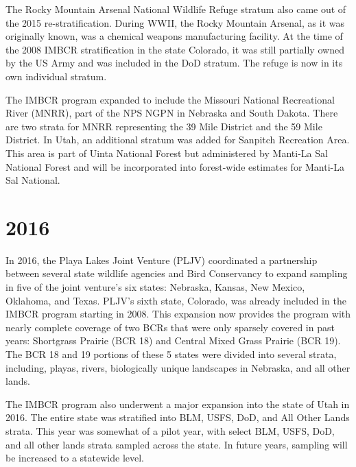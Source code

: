 \documentclass[
  letterpaper,
  DIV=11,
  numbers=noendperiod,
  oneside]{scrreprt}
\begin{document}
The Rocky Mountain Arsenal National Wildlife Refuge stratum also came
out of the 2015 re-stratification. During WWII, the Rocky Mountain
Arsenal, as it was originally known, was a chemical weapons
manufacturing facility. At the time of the 2008 IMBCR stratification in
the state Colorado, it was still partially owned by the US Army and was
included in the DoD stratum. The refuge is now in its own individual
stratum.

The IMBCR program expanded to include the Missouri National Recreational
River (MNRR), part of the NPS NGPN in Nebraska and South Dakota. There
are two strata for MNRR representing the 39 Mile District and the 59
Mile District. In Utah, an additional stratum was added for Sanpitch
Recreation Area. This area is part of Uinta National Forest but
administered by Manti-La Sal National Forest and will be incorporated
into forest-wide estimates for Manti-La Sal National.

\hypertarget{section-7}{%
\section*{\texorpdfstring{\textbf{2016}}{2016}}\label{section-7}}


In 2016, the Playa Lakes Joint Venture (PLJV) coordinated a partnership
between several state wildlife agencies and Bird Conservancy to expand
sampling in five of the joint venture's six states: Nebraska, Kansas,
New Mexico, Oklahoma, and Texas. PLJV's sixth state, Colorado, was
already included in the IMBCR program starting in 2008. This expansion
now provides the program with nearly complete coverage of two BCRs that
were only sparsely covered in past years: Shortgrass Prairie (BCR 18)
and Central Mixed Grass Prairie (BCR 19). The BCR 18 and 19 portions of
these 5 states were divided into several strata, including, playas,
rivers, biologically unique landscapes in Nebraska, and all other lands.

The IMBCR program also underwent a major expansion into the state of
Utah in 2016. The entire state was stratified into BLM, USFS, DoD, and
All Other Lands strata. This year was somewhat of a pilot year, with
select BLM, USFS, DoD, and all other lands strata sampled across the
state. In future years, sampling will be increased to a statewide level.
\end{document}
